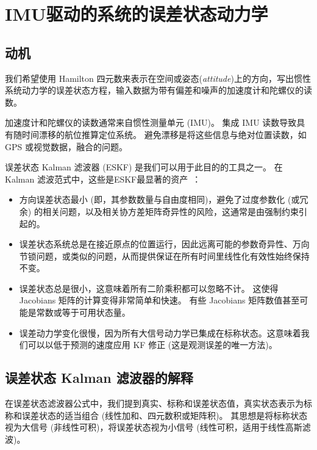 

\section{IMU驱动的系统的误差状态动力学}
\label{sec:es-kinematics}

\subsection{动机}

我们希望使用 Hamilton 四元数来表示在空间或姿态(\emph{attitude})上的方向，写出惯性系统动力学的误差状态方程，输入数据为带有偏差和噪声的加速度计和陀螺仪的读数。

加速度计和陀螺仪的读数通常来自惯性测量单元 (IMU)。
集成 IMU 读数导致具有随时间漂移的航位推算定位系统。
避免漂移是将这些信息与绝对位置读数，如 GPS 或视觉数据，融合的问题。

误差状态 Kalman 滤波器 (ESKF) 是我们可以用于此目的的工具之一。 
在 Kalman 滤波范式中，这些是ESKF最显著的资产~\citep{MADYASTHA-11}：

\begin{itemize}
\item 方向误差状态最小 (即，其参数数量与自由度相同)，避免了过度参数化 (或冗余) 的相关问题，以及相关协方差矩阵奇异性的风险，这通常是由强制约束引起的。
\item 误差状态系统总是在接近原点的位置运行，因此远离可能的参数奇异性、万向节锁问题，或类似的问题，从而提供保证在所有时间里线性化有效性始终保持不变。
\item 误差状态总是很小，这意味着所有二阶乘积都可以忽略不计。 
这使得 Jacobians 矩阵的计算变得非常简单和快速。 
有些 Jacobians 矩阵数值甚至可能是常数或等于可用状态量。
\item 误差动力学变化很慢，因为所有大信号动力学已集成在标称状态。这意味着我们可以以低于预测的速度应用 KF 修正 (这是观测误差的唯一方法)。
\end{itemize}


\subsection{误差状态 Kalman 滤波器的解释}

在误差状态滤波器公式中，我们提到真实、标称和误差状态值，真实状态表示为标称和误差状态的适当组合 (线性加和、四元数积或矩阵积)。 
其思想是将标称状态视为大信号 (非线性可积)，将误差状态视为小信号 (线性可积，适用于线性高斯滤波)。

